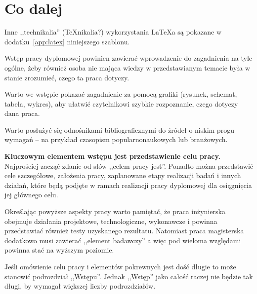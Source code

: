 \section{Co dalej}
Inne ,,technikalia'' (\TeX{nikalia}?) wykorzystania \LaTeX{a} są pokazane w dodatku~\ref{app:latex} niniejszego szablonu. %

Wstęp pracy dyplomowej powinien zawierać wprowadzenie do zagadnienia na tyle ogólne, żeby również osoba nie mająca wiedzy w przedstawianym temacie była w stanie zrozumieć, czego ta praca dotyczy.

Warto we wstępie pokazać zagadnienie za pomocą grafiki (rysunek, schemat, tabela, wykres), aby ułatwić czytelnikowi szybkie rozpoznanie, czego dotyczy dana praca.

Warto posłużyć się odnośnikami bibliograficznymi do źródeł o niskim progu wymagań -- na przykład czasopism popularnonaukowych lub branżowych.

\textbf{Kluczowym elementem wstępu jest przedstawienie celu pracy.} Najprościej zacząć zdanie od słów ,,celem pracy jest''. Ponadto można przedstawić cele szczegółowe, założenia pracy, zaplanowane etapy realizacji badań i innych działań, które będą podjęte w ramach realizacji pracy dyplomowej dla osiągnięcia jej głównego celu.

Określając powyższe aspekty pracy warto pamiętać, że praca inżynierska obejmuje działania projektowe, technologiczne, wykonawcze i powinna przedstawiać również testy uzyskanego rezultatu. Natomiast praca magisterska dodatkowo musi zawierać ,,element badawczy'' a więc pod wieloma względami powinna stać na wyższym poziomie.

Jeśli omówienie celu pracy i elementów pokrewnych jest dość długie to może stanowić podrozdział ,,Wstępu''. Jednak ,,Wstęp'' jako całość raczej nie będzie tak długi, by wymagał większej liczby podrozdziałów.